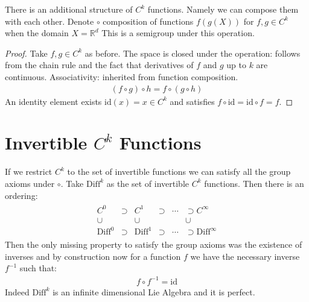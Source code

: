 \documentclass[10pt, oneside]{article}
\newcommand{\R}{\mathbb{R}}
\begin{document}
  There is an additional structure of $C^k$ functions. Namely we can compose them with each other. Denote $\circ$ composition of functions $f(g(X))$ for $f,g \in C^k$ when the domain $X=\R^d$
  This is a semigroup under this operation.
  \begin{proof}
     Take $f,g \in C^k$ as before. The space is closed under the operation: follows from the chain rule and the fact that derivatives of $f$ and $g$ up to $k$ are continuous.
     Associativity: inherited from function composition.
     \begin{align*}
        (f \circ g) \circ h = f \circ (g \circ h)
     \end{align*}
     An identity element exists $\text{id}(x) = x \in C^k$ and satisfies $f \circ \text{id} = \text{id} \circ f = f$.
  \end{proof}
\section*{Invertible $C^k$ Functions}
  If we restrict $C^k$ to the set of invertible functions we can satisfy all the group axioms under $\circ$.
  Take $\text{Diff}^k$ as the set of invertible $C^k$ functions. Then there is an ordering:
  \begin{align*}
     \begin{array}{cccccc}
        C^0 & \supset & C^1 & \supset & \cdots & \supset C^\infty \\
        \cup & & \cup & & & \cup \\
        \text{Diff}^0 & \supset & \text{Diff}^1 & \supset & \cdots & \supset \text{Diff}^\infty
\end{array}
  \end{align*}
  Then the only missing property to satisfy the group axioms was the existence of inverses and by construction now for a function $f$ we have the necessary inverse $f^{-1}$ such that:
  \begin{align*}
     f \circ f^{-1} = \text{id}
  \end{align*}
  Indeed $\text{Diff}^k$ is an infinite dimensional Lie Algebra and it is perfect.\cite{Banyaga1997}
\end{document}
